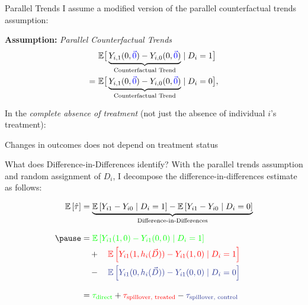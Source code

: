 \documentclass[aspectratio=169]{beamer}
\begin{document}
\begin{frame}{Parallel Trends}
    I assume a modified version of the parallel counterfactual trends assumption: 

    \textbf{Assumption:} \textit{Parallel Counterfactual Trends}
    \begin{align*}
        &\mathbb{E}\big[ \underbrace{Y_{i,1}(0, \textcolor{blue}{\vec{0}}) - Y_{i,0}(0, \textcolor{blue}{\vec{0}})}_{\text{Counterfactual Trend}} \mid D_i = 1 \big] \\
        = \ &\mathbb{E}\big[ \underbrace{Y_{i,1}(0, \textcolor{blue}{\vec{0}}) - Y_{i,0}(0, \textcolor{blue}{\vec{0}})}_{\text{Counterfactual Trend}} \mid D_i = 0 \big],
    \end{align*}

    \vspace{5mm}
    In the \textit{complete absence of treatment }(not just the absence of individual $i$'s treatment):
    
    Changes in outcomes does not depend on treatment status
    
\end{frame}

\begin{frame}{What does Difference-in-Differences identify?}
    With the parallel trends assumption and random assignment of $D_i$, I decompose the difference-in-differences estimate as follows: 
        
    \begin{align*}
        \mathbb{E}\left[\hat{\tau}\right] &= \underbrace{\mathbb{E} \left[ Y_{i1} - Y_{i0} \mid D_i = 1 \right] - \mathbb{E} \left[ Y_{i1} - Y_{i0} \mid D_i = 0 \right]}_{\text{Difference-in-Differences}} \\[3mm]
        \pause&= 
        \textcolor{green}{\mathbb{E} \left[ Y_{i1}(1, 0) - Y_{i1}(0, 0) \mid D_i = 1 \right]} \\
        &\quad + \quad 
        \textcolor{red}{\mathbb{E} \left[ Y_{i1}(1, h_i(\vec{D})) - Y_{i1}(1, 0) \mid D_i = 1 \right]} \\ 
        &\quad - \quad  
        \textcolor{purple}{\mathbb{E} \left[ Y_{i1}(0, h_i(\vec{D})) - Y_{i1}(0, 0) \mid D_i = 0 \right]} \\[3mm]
        &= \textcolor{green}{\tau_{\text{direct}}} + \textcolor{red}{\tau_{\text{spillover, treated}}} - \textcolor{purple}{\tau_{\text{spillover, control}}}
    \end{align*}

\end{frame}
\end{document}
